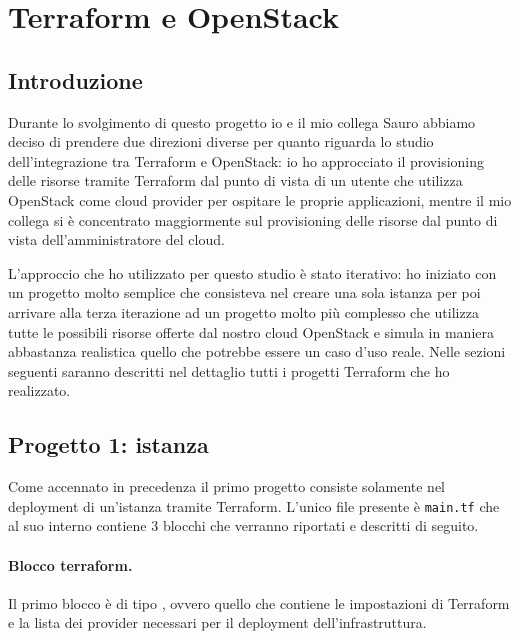 \section{Terraform e OpenStack}

\subsection{Introduzione}
Durante lo svolgimento di questo progetto io e il mio collega Sauro abbiamo deciso di prendere due direzioni diverse per quanto riguarda lo studio dell'integrazione tra Terraform e OpenStack: io ho approcciato il provisioning delle risorse tramite Terraform dal punto di vista di un utente che utilizza OpenStack come cloud provider per ospitare le proprie applicazioni, mentre il mio collega si è concentrato maggiormente sul provisioning delle risorse dal punto di vista dell'amministratore del cloud.

L'approccio che ho utilizzato per questo studio è stato iterativo: ho iniziato con un progetto molto semplice che consisteva nel creare una sola istanza per poi arrivare alla terza iterazione ad un progetto molto più complesso che utilizza tutte le possibili risorse offerte dal nostro cloud OpenStack e simula in maniera abbastanza realistica quello che potrebbe essere un caso d'uso reale. Nelle sezioni seguenti saranno descritti nel dettaglio tutti i progetti Terraform che ho realizzato.

\subsection{Progetto 1: istanza}

Come accennato in precedenza il primo progetto consiste solamente nel deployment di un'istanza tramite Terraform. L'unico file presente è \verb|main.tf| che al suo interno contiene 3 blocchi che verranno riportati e descritti di seguito.

\paragraph{Blocco terraform.}
Il primo blocco è di tipo , ovvero quello che contiene le impostazioni di Terraform e la lista dei provider necessari per il deployment dell'infrastruttura.


